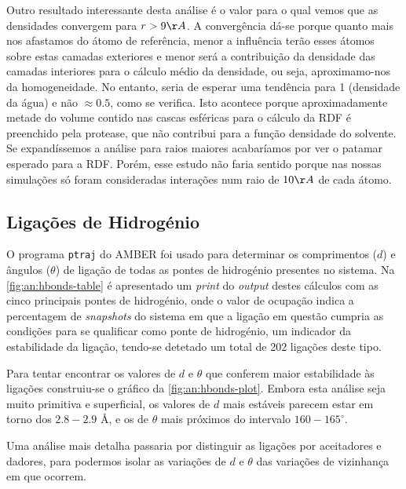 \documentclass[12pt,a4paper]{article}
\begin{document}
	Outro resultado interessante desta análise é o valor para o qual vemos que as densidades convergem para $r>9\AA$. A convergência dá-se porque quanto mais nos afastamos do átomo de referência, menor a influência terão esses átomos sobre estas camadas exteriores e menor será a contribuição da densidade das camadas interiores para o cálculo médio da densidade, ou seja, aproximamo-nos da homogeneidade. No entanto, seria de esperar uma tendência para 1 (densidade da água) e não $\approx0.5$, como se verifica. Isto acontece porque aproximadamente metade do volume contido nas cascas esféricas para o cálculo da RDF é preenchido pela protease, que não contribui para a função densidade do solvente. Se expandíssemos a análise para raios maiores acabaríamos por ver o patamar esperado para a RDF. Porém, esse estudo não faria sentido porque nas nossas simulações só foram consideradas interações num raio de $10 \AA$ de cada átomo.
	
\subsection{Ligações de Hidrogénio}
	O programa \verb|ptraj| do AMBER foi usado para determinar os comprimentos ($d$) e ângulos ($\theta$) de ligação de todas as pontes de hidrogénio presentes no sistema. Na \cref{fig:an:hbonds-table} é apresentado um \textit{print} do \textit{output} destes cálculos com as cinco principais pontes de hidrogénio, onde o valor de ocupação indica a percentagem de \textit{snapshots} do sistema em que a ligação em questão cumpria as condições para se qualificar como ponte de hidrogénio, um indicador da estabilidade da ligação, tendo-se detetado um total de 202 ligações deste tipo.
	
	Para tentar encontrar os valores de $d$ e $\theta$ que conferem maior estabilidade às ligações construiu-se o gráfico da \cref{fig:an:hbonds-plot}. Embora esta análise seja muito primitiva e superficial, os valores de $d$ mais estáveis parecem estar em torno dos $2.8 - 2.9$ \AA, e os de $\theta$ mais próximos do intervalo $160 - 165 ^{\circ}$.
	
	Uma análise mais detalha passaria por distinguir as ligações por aceitadores e dadores, para podermos isolar as variações de $d$ e $\theta$ das variações de vizinhança em que ocorrem.
	
\end{document}
